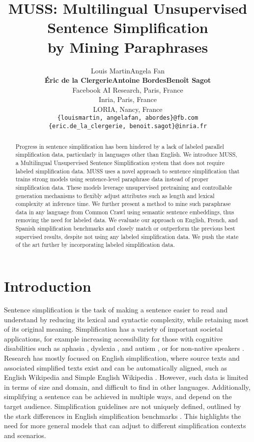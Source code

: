 \documentclass[11pt]{article}
\title{MUSS: Multilingual Unsupervised Sentence Simplification\\ by Mining Paraphrases}
\author{Louis Martin\quad Angela Fan\\ \large\textbf{\'Eric de la Clergerie\quad Antoine Bordes\quad Beno\^it Sagot}\\
  Facebook AI Research, Paris, France \\
  Inria, Paris, France \\
  LORIA, Nancy, France\\
  \texttt{\{louismartin, angelafan, abordes\}@fb.com}\\
  \texttt{\{eric.de\_la\_clergerie, benoit.sagot\}@inria.fr}}
\newcommand{\muss}{\textsc{MUSS}\xspace}
\begin{document}
\maketitle
\begin{abstract}
Progress in sentence simplification has been hindered by a lack of labeled  parallel simplification data, particularly in languages other than English.
We introduce \muss, a Multilingual Unsupervised Sentence Simplification system that does not require labeled simplification data.
\muss uses a novel approach to sentence simplification that trains strong models using sentence-level paraphrase data  instead of proper simplification data.
These models leverage unsupervised pretraining and controllable generation mechanisms to flexibly adjust attributes such as length and lexical complexity at inference time.
We further present a method to mine such paraphrase data in any language from Common Crawl using semantic sentence embeddings, thus removing the need for labeled data.
We evaluate our approach on English, French, and Spanish simplification benchmarks and closely match or outperform the previous best supervised results, despite not using any labeled simplification data.
We push the state of the art further by incorporating labeled simplification data.
\end{abstract} \section{Introduction}

Sentence simplification is the task of making a sentence easier to read and understand by reducing its lexical and syntactic complexity, while retaining most of its original meaning. Simplification has a variety of important societal applications, for example increasing accessibility for those with cognitive disabilities such as aphasia \cite{carroll1998practical}, dyslexia \cite{rello2013simplify}, and autism \cite{evans2014evaluation}, or for non-native speakers \cite{paetzold2016unsupervised}. Research has mostly focused on English simplification, where source texts and  associated simplified texts exist and can be automatically aligned, such as English Wikipedia and Simple English Wikipedia \cite{zhang2017sentence}. However, such data is limited in terms of size and domain, and difficult to find in other languages.
Additionally, simplifying a sentence can be achieved in multiple ways, and depend on the target audience. Simplification guidelines are not uniquely defined, outlined by the stark differences in English simplification benchmarks \cite{alva2020asset}.
This highlights the need for more general models that can adjust to different simplification contexts and scenarios.
\end{document}
